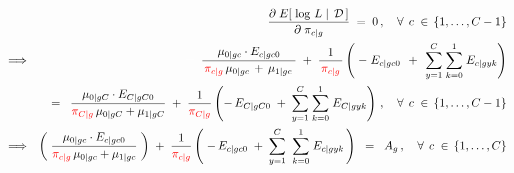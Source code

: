 \begin{eqnarray*}
&&
	\dfrac{\partial\;E\!\left[\,\left.\log\,L\;\right\vert\;\mathcal{D}\,\right]}{\partial\;\pi_{c \vert g}} \;=\; 0\,,
	\quad\forall\;\,c\;\in\,\{1,\ldots,C-1\}
\\
&\Longrightarrow&
	\;{\color{white}=} \;\;
		\dfrac{\mu_{0 \vert gc}\cdot E_{c \vert gc0}}{\mbox{}\,{\color{red}\pi_{c \vert g}}\,\mu_{0 \vert gc} \,+\, \mu_{1\vert gc}\;\mbox{}}
		\;+\;
		\dfrac{1}{\mbox{}\,{\color{red}\pi_{c \vert g}}\,\mbox{}}
		\left(
			\;-\;E_{c \vert gc0}
			\,\;+\;\,
			\overset{C}{\underset{y=1}{\sum}} \; \overset{1}{\underset{k=0}{\sum}} \; E_{c \vert gyk}
		\right)
\\
&&
	= \;\;
		\dfrac{\mu_{0 \vert gC} \cdot E_{C \vert gC0}}{{\color{red}\pi_{C \vert g}}\,\mu_{0 \vert gC}+\mu_{1\vert gC}}
		\;+\;
		\dfrac{1}{{\color{red}\pi_{C \vert g}}}
		\left(
			-\,E_{C \vert gC0}
			\;+\;
			\overset{C}{\underset{y=1}{\sum}} \; \overset{1}{\underset{k=0}{\sum}} \; E_{C \vert gyk}
		\right)\,,	
	\quad\forall\;\,c\;\in\,\{1,\ldots,C-1\}
\\
&\Longrightarrow&
		\left(\;
			\dfrac{\mu_{0 \vert gc} \cdot E_{c \vert gc0}}{
				{\color{red}\pi_{c \vert g}}\,\mu_{0 \vert gc} + \mu_{1\vert gc}
				}
		\;\right)
		\; + \;
		\dfrac{1}{\color{red}\pi_{c \vert g}}
		\left(\;
			-\,E_{c \vert gc0}
			\; + \;
			\overset{C}{\underset{y=1}{\sum}}\;\;
			\overset{1}{\underset{k=0}{\sum}}\;
			E_{c \vert gyk}
		\,\right)
		\;\; = \;\;
		A_{g}\,,
		\quad\forall\;\,c\;\in\,\{1,\ldots,C\}
\end{eqnarray*}

